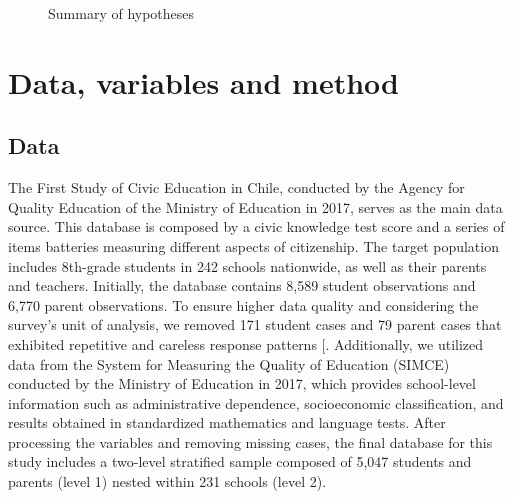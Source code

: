 \documentclass[
  12pt,
  letterpaper,
]{article}
\begin{document}
\begin{figure}


\caption{\label{fig-hypotheses}Summary of hypotheses}

\end{figure}%

\section{Data, variables and method}\label{data-variables-and-method}

\subsection{Data}\label{data}

The First Study of Civic Education in Chile, conducted by the Agency for
Quality Education of the Ministry of Education in 2017, serves as the
main data source. This database is composed by a civic knowledge test
score and a series of items batteries measuring different aspects of
citizenship. The target population includes 8th-grade students in 242
schools nationwide, as well as their parents and teachers. Initially,
the database contains 8,589 student observations and 6,770 parent
observations. To ensure higher data quality and considering the survey's
unit of analysis, we removed 171 student cases and 79 parent cases that
exhibited repetitive and careless response patterns
{[}\citeproc{ref-gottfried_autocorrelation_2022}{73}{]}. Additionally,
we utilized data from the System for Measuring the Quality of Education
(SIMCE) conducted by the Ministry of Education in 2017, which provides
school-level information such as administrative dependence,
socioeconomic classification, and results obtained in standardized
mathematics and language tests. After processing the variables and
removing missing cases, the final database for this study includes a
two-level stratified sample composed of 5,047 students and parents
(level 1) nested within 231 schools (level 2).
\end{document}

